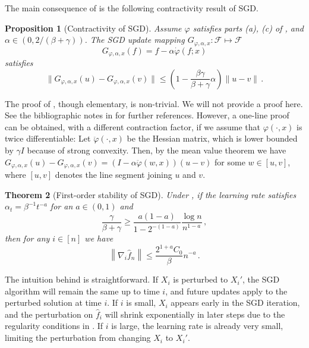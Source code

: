 \documentclass[11pt]{article}
\theoremstyle{plain}
\newtheorem{theorem}{Theorem}[section]
\newtheorem{proposition}[theorem]{Proposition}
\begin{document}
The main consequence of  is the following contractivity result of SGD.
\begin{proposition}[Contractivity of SGD]
    \label{pro:6.1-contractive-sgd}
    Assume $\varphi$ satisfies parts (a), (c) of , and $\alpha\in (0,2/(\beta+\gamma))$. 
    The SGD update mapping $G_{\varphi,\alpha,x}:\mathcal F\mapsto\mathcal F$
    $$
    G_{\varphi,\alpha,x}(f) = f -\alpha\dot\varphi(f;x)
    $$
    satisfies
    \begin{equation}\label{eq:6.1-sgd-contractivity}
    \|G_{\varphi,\alpha,x}(u)-G_{\varphi,\alpha,x}(v)\|\le \left(1-\frac{\beta\gamma}{\beta+\gamma}\alpha\right)\|u-v\|\,.
    \end{equation}
\end{proposition}
The proof of , though elementary, is non-trivial.  We will not provide a proof here.  See the bibliographic notes in  for further references.  However, a one-line proof can be obtained, with a different contraction factor, if we assume that $\varphi(\cdot,x)$ is twice differentiable: Let $\ddot{\varphi}(\cdot,x)$ be the Hessian matrix, which is lower bounded by $\gamma I$ because of strong convexity. Then, by the mean value theorem we have
$G_{\varphi,\alpha,x}(u)-G_{\varphi,\alpha,x}(v) = (I-\alpha\ddot\varphi(w,x))(u-v)$
for some $w\in[u,v]$, where $[u,v]$ denotes the line segment joining $u$ and $v$.

\begin{theorem}[First-order stability of SGD]\label{thm:6.1-first-order-stab-sgd}
    Under , if the learning rate satisfies $\alpha_t=\beta^{-1}t^{-a}$ for an $a\in(0,1)$ and
    $$\frac{\gamma}{\beta+\gamma}\ge \frac{a(1-a)}{1-2^{-(1-a)}}\frac{\log n}{n^{1-a}}\,,$$
    then for any $i\in [n]$ we have $$\left\|\nabla_i \hat f_n\right\|\le \frac{2^{1+a}C_0}{\beta}n^{-a}\,.$$
\end{theorem}

The intuition behind  is straightforward.
If $X_i$ is perturbed to $X_i'$, the SGD algorithm will remain the same up to time $i$, and future updates apply to the perturbed solution at time $i$. If $i$ is small, $X_i$ appears early in the SGD iteration, and the perturbation on $\hat f_i$ will shrink exponentially in later steps due to the regularity conditions in .  If $i$ is large, the learning rate is already very small, limiting the perturbation from changing $X_i$ to $X_i'$.
\end{document}
